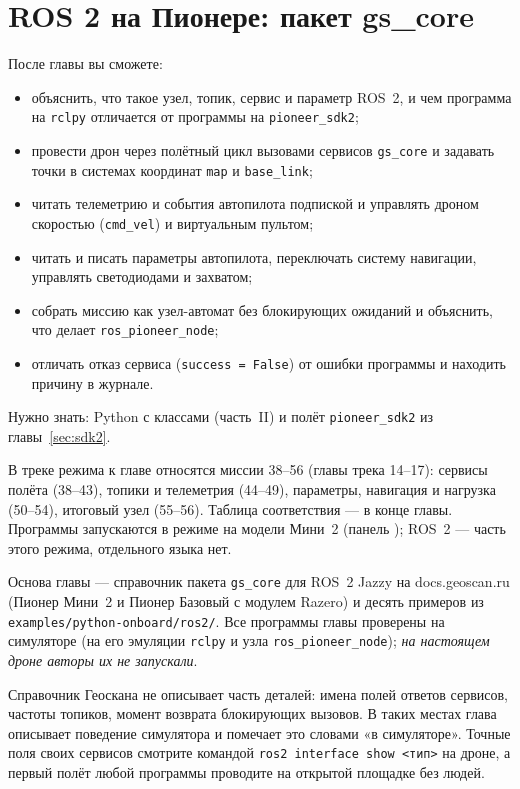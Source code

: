 \section{ROS 2 на Пионере: пакет gs\_core}
\label{sec:ros2}

\begin{infobox}
После главы вы сможете:
\begin{itemize}
    \item объяснить, что такое узел, топик, сервис и параметр ROS~2, и чем программа на \texttt{rclpy} отличается от программы на \texttt{pioneer\_sdk2};
    \item провести дрон через полётный цикл вызовами сервисов \texttt{gs\_core} и задавать точки в системах координат \texttt{map} и \texttt{base\_link};
    \item читать телеметрию и события автопилота подпиской и управлять дроном скоростью (\texttt{cmd\_vel}) и виртуальным пультом;
    \item читать и писать параметры автопилота, переключать систему навигации, управлять светодиодами и захватом;
    \item собрать миссию как узел-автомат без блокирующих ожиданий и объяснить, что делает \texttt{ros\_pioneer\_node};
    \item отличать отказ сервиса (\verb|success = False|) от ошибки программы и находить причину в журнале.
\end{itemize}
Нужно знать: Python с классами (часть~II) и полёт \texttt{pioneer\_sdk2} из главы~\ref{sec:sdk2}.
\end{infobox}

\begin{missionbox}
В треке  режима  к главе относятся миссии 38--56 (главы трека 14--17): сервисы полёта (38--43), топики и телеметрия (44--49), параметры, навигация и нагрузка (50--54), итоговый узел (55--56). Таблица соответствия --- в конце главы. Программы запускаются в режиме  на модели Мини~2 (панель ); ROS~2 --- часть этого режима, отдельного языка нет.
\end{missionbox}

\begin{infobox}
Основа главы --- справочник пакета \texttt{gs\_core} для ROS~2 Jazzy на docs.geoscan.ru (Пионер Мини~2 и Пионер Базовый с модулем Razero) и десять примеров из \texttt{examples/python-onboard/ros2/}. Все программы главы проверены на симуляторе (на его эмуляции \texttt{rclpy} и узла \texttt{ros\_pioneer\_node}); \emph{на настоящем дроне авторы их не запускали}.

Справочник Геоскана не описывает часть деталей: имена полей ответов сервисов, частоты топиков, момент возврата блокирующих вызовов. В таких местах глава описывает поведение симулятора и помечает это словами «в симуляторе». Точные поля своих сервисов смотрите командой \verb|ros2 interface show <тип>| на дроне, а первый полёт любой программы проводите на открытой площадке без людей.
\end{infobox}

